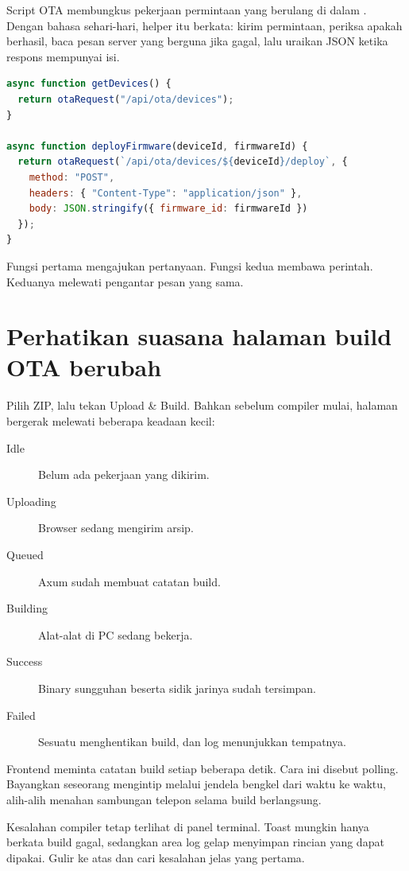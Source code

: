 Script OTA membungkus pekerjaan permintaan yang berulang di dalam . Dengan bahasa sehari-hari, helper itu berkata: kirim permintaan, periksa apakah berhasil, baca pesan server yang berguna jika gagal, lalu uraikan JSON ketika respons mempunyai isi.

\begin{lstlisting}[language=JavaScript]
async function getDevices() {
  return otaRequest("/api/ota/devices");
}

async function deployFirmware(deviceId, firmwareId) {
  return otaRequest(`/api/ota/devices/${deviceId}/deploy`, {
    method: "POST",
    headers: { "Content-Type": "application/json" },
    body: JSON.stringify({ firmware_id: firmwareId })
  });
}
\end{lstlisting}

Fungsi pertama mengajukan pertanyaan. Fungsi kedua membawa perintah. Keduanya melewati pengantar pesan yang sama.

\section{Perhatikan suasana halaman build OTA berubah}

Pilih ZIP, lalu tekan Upload \& Build. Bahkan sebelum compiler mulai, halaman bergerak melewati beberapa keadaan kecil:

\begin{description}
  \item[Idle] Belum ada pekerjaan yang dikirim.
  \item[Uploading] Browser sedang mengirim arsip.
  \item[Queued] Axum sudah membuat catatan build.
  \item[Building] Alat-alat di PC sedang bekerja.
  \item[Success] Binary sungguhan beserta sidik jarinya sudah tersimpan.
  \item[Failed] Sesuatu menghentikan build, dan log menunjukkan tempatnya.
\end{description}

Frontend meminta catatan build setiap beberapa detik. Cara ini disebut polling. Bayangkan seseorang mengintip melalui jendela bengkel dari waktu ke waktu, alih-alih menahan sambungan telepon selama build berlangsung.

Kesalahan compiler tetap terlihat di panel terminal. Toast mungkin hanya berkata build gagal, sedangkan area log gelap menyimpan rincian yang dapat dipakai. Gulir ke atas dan cari kesalahan jelas yang pertama.

